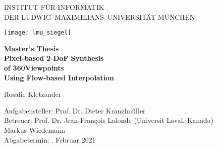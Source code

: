 \begin{center}

\vspace*{-2cm}

{\Huge INSTITUT FÜR INFORMATIK\\[1mm]}
DER LUDWIG--MAXIMILIANS--UNIVERSITÄT MÜNCHEN\\

\vspace*{1cm}

\texttt{[image: lmu\_siegel]}

\vspace*{2cm}

{\Large \textbf{Master's Thesis}}\\

\vspace{2.0cm}
{\Huge \textbf{Pixel-based 2-DoF Synthesis}}\\
\vspace*{3mm}
{\Huge \textbf{of 360\degree Viewpoints}}\\
\vspace*{3mm}
{\Huge \textbf{Using Flow-based Interpolation}}\\
\vspace{1.5cm}

{\LARGE Rosalie Kletzander} %
\vspace{2cm}

\parbox{1cm}{
\begin{large}
\begin{tabbing}
Aufgabensteller: \hspace{.5cm} \=Prof. Dr. Dieter Kranzlmüller\\[2mm]
Betreuer:
\>Prof. Dr. Jean-Fran\c{c}ois Lalonde (Universit Laval, Kanada)\\
\>Markus Wiedemann\\[5mm]%
Abgabetermin: . Februar 2021\\
\end{tabbing}
\end{large}}\\
\vspace{5mm}

\end{center}

